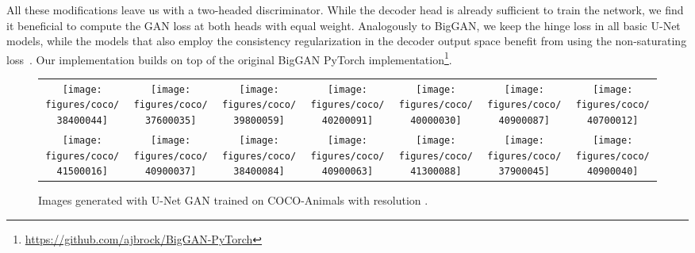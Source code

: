 \documentclass[10pt,twocolumn,letterpaper]{article}
\begin{document}
All these modifications leave us with a two-headed discriminator.
While the decoder head is already sufficient to train the network, we find it beneficial to compute the GAN loss at both heads with equal weight. Analogously to BigGAN, we keep the hinge loss \cite{Zhang_SAGAN19} in all basic U-Net models, while the models that also employ the consistency regularization in the decoder output space benefit from using the non-saturating loss~\cite{goodfellow2014generative}.
Our implementation builds on top of the original BigGAN PyTorch implementation\footnote{\url{https://github.com/ajbrock/BigGAN-PyTorch}}.









\begin{figure*}[h]
\begin{centering}
\setlength{\tabcolsep}{0.0em}
\renewcommand{\arraystretch}{0}
\par\end{centering}
\begin{centering}
\vspace{-1em}
\hfill{}\begin{tabular}{@{}c@{\hskip 0.05in}c@{\hskip 0.05in}c@{\hskip 0.05in}c@{\hskip 0.05in}c@{\hskip 0.05in}c@{\hskip 0.05in}c@{}}
\texttt{[image: figures/coco/38400044]} &
\texttt{[image: figures/coco/37600035]} &
\texttt{[image: figures/coco/39800059]} &
\texttt{[image: figures/coco/40200091]} &
\texttt{[image: figures/coco/40000030]}  & \texttt{[image: figures/coco/40900087]}  &
\texttt{[image: figures/coco/40700012]} 

\tabularnewline

\texttt{[image: figures/coco/41500016]} &
\texttt{[image: figures/coco/40900037]} &
\texttt{[image: figures/coco/38400084]} &
\texttt{[image: figures/coco/40900063]}  &
\texttt{[image: figures/coco/41300088]}  &
\texttt{[image: figures/coco/37900045]}  &
\texttt{[image: figures/coco/40900040]}
\tabularnewline






\end{tabular}\hfill{}
\par\end{centering}
\vspace{-0.5em}
\caption{\label{fig:coco_pics} Images generated with U-Net GAN trained on COCO-Animals with resolution .
 }
\vspace{-0.5em}
\end{figure*}
\end{document}
